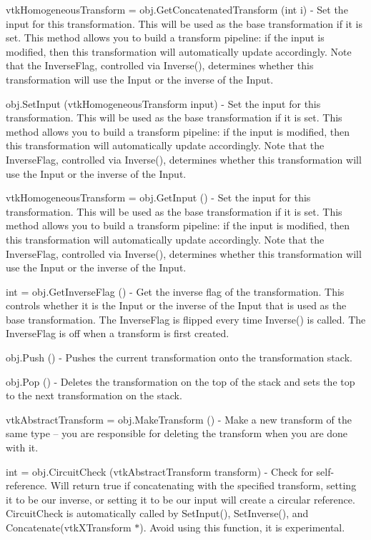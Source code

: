 \begin{DoxyItemize}
\item {\ttfamily vtk\-Homogeneous\-Transform = obj.\-Get\-Concatenated\-Transform (int i)} -\/ Set the input for this transformation. This will be used as the base transformation if it is set. This method allows you to build a transform pipeline\-: if the input is modified, then this transformation will automatically update accordingly. Note that the Inverse\-Flag, controlled via Inverse(), determines whether this transformation will use the Input or the inverse of the Input.  
\item {\ttfamily obj.\-Set\-Input (vtk\-Homogeneous\-Transform input)} -\/ Set the input for this transformation. This will be used as the base transformation if it is set. This method allows you to build a transform pipeline\-: if the input is modified, then this transformation will automatically update accordingly. Note that the Inverse\-Flag, controlled via Inverse(), determines whether this transformation will use the Input or the inverse of the Input.  
\item {\ttfamily vtk\-Homogeneous\-Transform = obj.\-Get\-Input ()} -\/ Set the input for this transformation. This will be used as the base transformation if it is set. This method allows you to build a transform pipeline\-: if the input is modified, then this transformation will automatically update accordingly. Note that the Inverse\-Flag, controlled via Inverse(), determines whether this transformation will use the Input or the inverse of the Input.  
\item {\ttfamily int = obj.\-Get\-Inverse\-Flag ()} -\/ Get the inverse flag of the transformation. This controls whether it is the Input or the inverse of the Input that is used as the base transformation. The Inverse\-Flag is flipped every time Inverse() is called. The Inverse\-Flag is off when a transform is first created.  
\item {\ttfamily obj.\-Push ()} -\/ Pushes the current transformation onto the transformation stack.  
\item {\ttfamily obj.\-Pop ()} -\/ Deletes the transformation on the top of the stack and sets the top to the next transformation on the stack.  
\item {\ttfamily vtk\-Abstract\-Transform = obj.\-Make\-Transform ()} -\/ Make a new transform of the same type -- you are responsible for deleting the transform when you are done with it.  
\item {\ttfamily int = obj.\-Circuit\-Check (vtk\-Abstract\-Transform transform)} -\/ Check for self-\/reference. Will return true if concatenating with the specified transform, setting it to be our inverse, or setting it to be our input will create a circular reference. Circuit\-Check is automatically called by Set\-Input(), Set\-Inverse(), and Concatenate(vtk\-X\-Transform $\ast$). Avoid using this function, it is experimental.  

\end{DoxyItemize}
